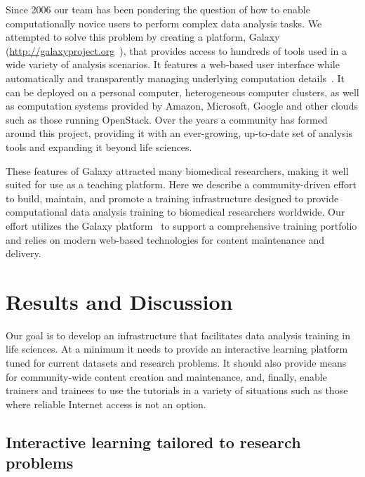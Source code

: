 Since 2006 our team has been pondering the question of how to enable computationally novice users to perform complex data analysis tasks. We attempted to solve this problem by creating a platform, Galaxy (\url{http://galaxyproject.org}~\cite{afgan2016galaxy}), that provides access to hundreds of tools used in a wide variety of analysis scenarios. It features a web-based user interface while automatically and transparently managing underlying computation details~\cite{afgan2016galaxy}. It can be deployed on a personal computer, heterogeneous computer clusters, as well as computation systems provided by Amazon, Microsoft, Google and other clouds such as those running OpenStack. Over the years a community has formed around this project, providing it with an ever-growing, up-to-date set of analysis tools and expanding it beyond life sciences.

These features of Galaxy attracted many biomedical researchers, making it well suited for use as a teaching platform. Here we describe a community-driven effort to build, maintain, and promote a training infrastructure designed to provide computational data analysis training to biomedical researchers worldwide. Our effort utilizes the Galaxy platform~\cite{afgan2016galaxy} to support a comprehensive training portfolio and relies on modern web-based technologies for content maintenance and delivery.

\section*{Results and Discussion}
Our goal is to develop an infrastructure that facilitates data analysis training in life sciences. At a minimum it needs to provide an interactive learning platform tuned for current datasets and research problems. It should also provide means for community-wide content creation and maintenance, and, finally, enable trainers and trainees to use the tutorials in a variety of situations such as those where reliable Internet access is not an option.

\subsection*{Interactive learning tailored to research problems}

